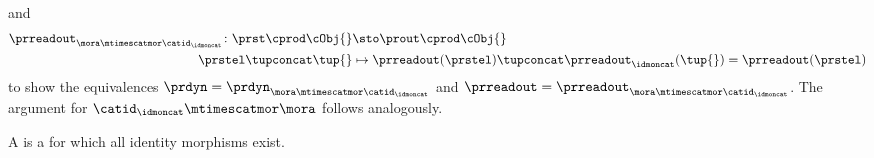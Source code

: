 \begin{example}
\begin{equation*}
    \end{equation*}
    and
    \begin{equation*}
        \begin{aligned}
            \prreadout_{\mora \mtimescatmor\catid_\idmoncat}\colon \prst \cprod \cObj{} & \sto \prout \cprod \cObj{} \\
            \prstel \tupconcat \tup{}                                                   & \mapsto \prreadout(\prstel)\tupconcat \prreadout_\idmoncat(\tup{})=\prreadout(\prstel)
        \end{aligned}
    \end{equation*}
    to show the equivalences $\prdyn=\prdyn_{\mora \mtimescatmor \catid_\idmoncat}$ and $\prreadout=\prreadout_{\mora \mtimescatmor \catid_\idmoncat}$.
    The argument for $\catid_\idmoncat \mtimescatmor \mora$ follows analogously.
\end{example}

\begin{ctdefinition}
    \label{def:strict-monoidal-stacking-cat}
    A  is a  for which all identity morphisms exist.
\end{ctdefinition}


